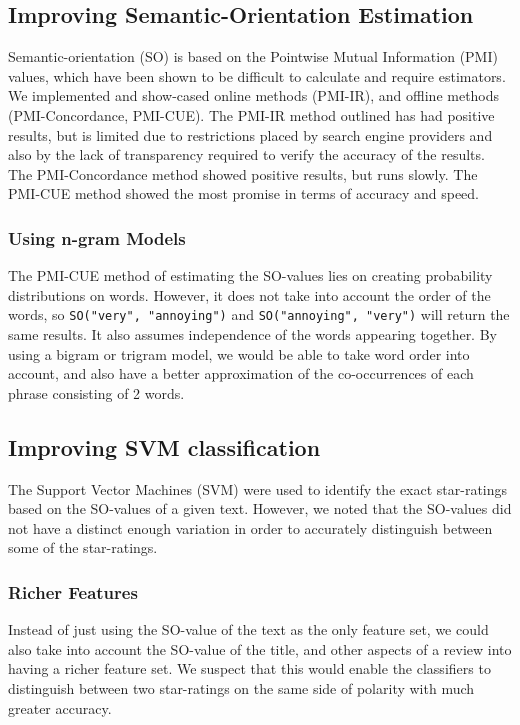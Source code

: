 \documentclass[11pt]{report} %
\begin{document}
\subsection{Improving Semantic-Orientation Estimation}
Semantic-orientation (SO) is based on the Pointwise Mutual Information (PMI) values, which have been shown to be difficult to calculate and require estimators. We implemented and show-cased online methods (PMI-IR), and offline methods (PMI-Concordance, PMI-CUE). The PMI-IR method outlined has had positive results, but is limited due to restrictions placed by search engine providers and also by the lack of transparency required to verify the accuracy of the results. The PMI-Concordance method showed positive results,  but runs slowly. The PMI-CUE method showed the most promise in terms of accuracy and speed.
\subsubsection{Using n-gram Models}
The PMI-CUE method of estimating the SO-values lies on creating probability distributions on words. However, it does not take into account the order of the words, so \verb|SO("very", "annoying")| and \verb|SO("annoying", "very")| will return the same results. It also assumes independence of the words appearing together. By using a bigram or trigram model, we would be able to take word order into account, and also have a better approximation of the co-occurrences of each phrase consisting of 2 words.

\subsection{Improving SVM classification}
The Support Vector Machines (SVM) were used to identify the exact star-ratings based on the SO-values of a given text. However, we noted that the SO-values did not have a distinct enough variation in order to accurately distinguish between some of the star-ratings.

\subsubsection{Richer Features}
Instead of just using the SO-value of the text as the only feature set, we could also take into account the SO-value of the title, and other aspects of a review into having a richer feature set. We suspect that this would enable the classifiers to distinguish between two star-ratings on the same side of polarity with much greater accuracy.
\end{document}
